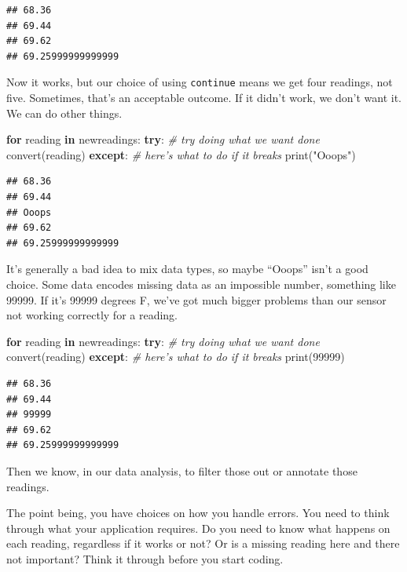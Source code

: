 \documentclass[
]{book}
\newenvironment{Shaded}{\begin{snugshade}}{\end{snugshade}}
\newcommand{\BuiltInTok}[1]{#1}
\newcommand{\CommentTok}[1]{\textcolor[rgb]{0.56,0.35,0.01}{\textit{#1}}}
\newcommand{\ControlFlowTok}[1]{\textcolor[rgb]{0.13,0.29,0.53}{\textbf{#1}}}
\newcommand{\DecValTok}[1]{\textcolor[rgb]{0.00,0.00,0.81}{#1}}
\newcommand{\KeywordTok}[1]{\textcolor[rgb]{0.13,0.29,0.53}{\textbf{#1}}}
\newcommand{\NormalTok}[1]{#1}
\newcommand{\StringTok}[1]{\textcolor[rgb]{0.31,0.60,0.02}{#1}}
\begin{document}
\begin{verbatim}
## 68.36
## 69.44
## 69.62
## 69.25999999999999
\end{verbatim}

Now it works, but our choice of using \texttt{continue} means we get four readings, not five. Sometimes, that's an acceptable outcome. If it didn't work, we don't want it. We can do other things.

\begin{Shaded}
\begin{Highlighting}[]
\ControlFlowTok{for}\NormalTok{ reading }\KeywordTok{in}\NormalTok{ newreadings:}
    \ControlFlowTok{try}\NormalTok{: }\CommentTok{# try doing what we want done}
\NormalTok{        convert(reading)}
    \ControlFlowTok{except}\NormalTok{: }\CommentTok{# here's what to do if it breaks}
        \BuiltInTok{print}\NormalTok{(}\StringTok{"Ooops"}\NormalTok{) }
\end{Highlighting}
\end{Shaded}

\begin{verbatim}
## 68.36
## 69.44
## Ooops
## 69.62
## 69.25999999999999
\end{verbatim}

It's generally a bad idea to mix data types, so maybe ``Ooops'' isn't a good choice. Some data encodes missing data as an impossible number, something like 99999. If it's 99999 degrees F, we've got much bigger problems than our sensor not working correctly for a reading.

\begin{Shaded}
\begin{Highlighting}[]
\ControlFlowTok{for}\NormalTok{ reading }\KeywordTok{in}\NormalTok{ newreadings:}
    \ControlFlowTok{try}\NormalTok{: }\CommentTok{# try doing what we want done}
\NormalTok{        convert(reading)}
    \ControlFlowTok{except}\NormalTok{: }\CommentTok{# here's what to do if it breaks}
        \BuiltInTok{print}\NormalTok{(}\DecValTok{99999}\NormalTok{) }
\end{Highlighting}
\end{Shaded}

\begin{verbatim}
## 68.36
## 69.44
## 99999
## 69.62
## 69.25999999999999
\end{verbatim}

Then we know, in our data analysis, to filter those out or annotate those readings.

The point being, you have choices on how you handle errors. You need to think through what your application requires. Do you need to know what happens on each reading, regardless if it works or not? Or is a missing reading here and there not important? Think it through before you start coding.
\end{document}
